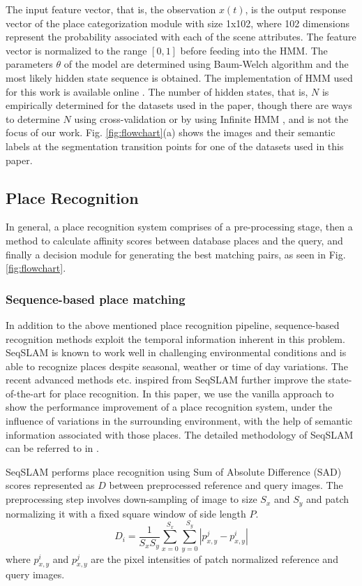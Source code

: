 \documentclass[letterpaper, 10 pt, conference]{ieeeconf}  %
\begin{document}
The input feature vector, that is, the observation $x(t)$, is the output response vector of the place categorization module with size 1x102, where 102 dimensions represent the probability associated with each of the scene attributes. The feature vector is normalized to the range $[0,1]$ before feeding into the HMM. The parameters $\theta$ of the model are determined using Baum-Welch algorithm \cite{baum1966statistical} and the most likely hidden state sequence is obtained. The implementation of HMM used for this work is available online \cite{hmmlearn}. The number of hidden states, that is, $N$ is empirically determined for the datasets used in the paper, though there are ways to determine $N$ using cross-validation \cite{celeux2008selecting} or by using Infinite HMM \cite{beal2002infinite}, and is not the focus of our work. Fig. \ref{fig:flowchart}(a) shows the images and their semantic labels at the segmentation transition points for one of the datasets used in this paper.

\subsection{Place Recognition}
In general, a place recognition system comprises of a pre-processing stage, then a method to calculate affinity scores between database places and the query, and finally a decision module for generating the best matching pairs, as seen in Fig. \ref{fig:flowchart}.
\subsubsection{Sequence-based place matching}
In addition to the above mentioned place recognition pipeline, sequence-based recognition methods exploit the temporal information inherent in this problem. SeqSLAM \cite{Milford2012} is known to work well in challenging environmental conditions and is able to recognize places despite seasonal, weather or time of day variations. The recent advanced methods \cite{milford2015sequence,wang2015improved}etc. inspired from SeqSLAM further improve the state-of-the-art for place recognition. In this paper, we use the vanilla approach to show the performance improvement of a place recognition system, under the influence of variations in the surrounding environment, with the help of semantic information associated with those places. The detailed methodology of SeqSLAM can be referred to in \cite{Milford2012}.

SeqSLAM performs place recognition using Sum of Absolute Difference (SAD) scores represented as $D$ between preprocessed reference and query images. The preprocessing step involves down-sampling of image to size $S_x$ and $S_y$ and patch normalizing it with a fixed square window of side length $P$.
\begin{equation}
 D_i = \frac{1}{S_xS_y} \sum\limits_{x=0}^{S_x}\sum\limits_{y=0}^{S_y}|p_{x,y}^j-p_{x,y}^i|
 \label{eq:SADscore}
\end{equation}
where $p_{x,y}^i$ and $p_{x,y}^j$ are the pixel intensities of patch normalized reference and query images.
\end{document}
